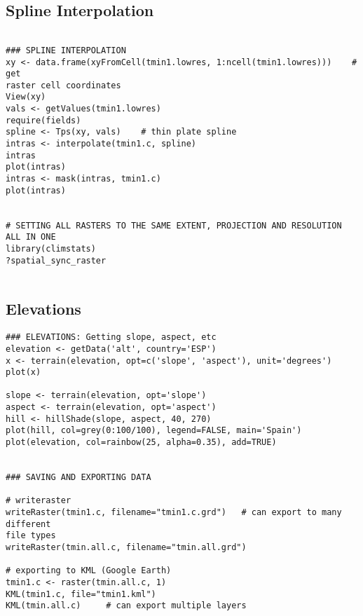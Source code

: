 \documentclass[11pt]{article} %
\begin{document}
\subsection{Spline Interpolation}
\begin{verbatim} 

### SPLINE INTERPOLATION
xy <- data.frame(xyFromCell(tmin1.lowres, 1:ncell(tmin1.lowres)))    # get
raster cell coordinates
View(xy)
vals <- getValues(tmin1.lowres)
require(fields)
spline <- Tps(xy, vals)    # thin plate spline
intras <- interpolate(tmin1.c, spline)
intras
plot(intras)
intras <- mask(intras, tmin1.c)
plot(intras)
 
 
# SETTING ALL RASTERS TO THE SAME EXTENT, PROJECTION AND RESOLUTION ALL IN ONE
library(climstats)
?spatial_sync_raster
 
 \end{verbatim}

\subsection{Elevations}
\begin{verbatim} 
### ELEVATIONS: Getting slope, aspect, etc
elevation <- getData('alt', country='ESP')
x <- terrain(elevation, opt=c('slope', 'aspect'), unit='degrees')
plot(x)
 
slope <- terrain(elevation, opt='slope')
aspect <- terrain(elevation, opt='aspect')
hill <- hillShade(slope, aspect, 40, 270)
plot(hill, col=grey(0:100/100), legend=FALSE, main='Spain')
plot(elevation, col=rainbow(25, alpha=0.35), add=TRUE)
 
 
### SAVING AND EXPORTING DATA
 
# writeraster
writeRaster(tmin1.c, filename="tmin1.c.grd")   # can export to many different
file types
writeRaster(tmin.all.c, filename="tmin.all.grd")
 
# exporting to KML (Google Earth)
tmin1.c <- raster(tmin.all.c, 1)
KML(tmin1.c, file="tmin1.kml")
KML(tmin.all.c)     # can export multiple layers
 \end{verbatim}
 
\newpage
\end{document}
